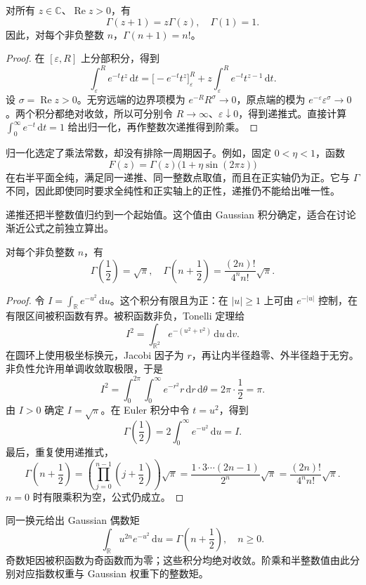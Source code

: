 \begin{proposition}[递推与归一化]\label{b3:prop:21-recurrence}
对所有 \(z\in\mathbb C\)、\(\operatorname{Re}z>0\)，有
\[
 \Gamma(z+1)=z\Gamma(z),\quad \Gamma(1)=1.
\]
因此，对每个非负整数 \(n\)，\(\Gamma(n+1)=n!\)。
\end{proposition}
\begin{proof}
在 \([\varepsilon,R]\) 上分部积分，得到
\[
 \int_\varepsilon^R e^{-t}t^z\,\mathrm{d}t
 =\bigl[-e^{-t}t^z\bigr]_\varepsilon^R
  +z\int_\varepsilon^R e^{-t}t^{z-1}\,\mathrm{d}t.
\]
设 \(\sigma=\operatorname{Re}z>0\)。无穷远端的边界项模为 \(e^{-R}R^\sigma\to0\)，原点端的模为 \(e^{-\varepsilon}\varepsilon^\sigma\to0\)。两个积分都绝对收敛，所以可分别令 \(R\to\infty\)、\(\varepsilon\downarrow0\)，得到递推式。直接计算 \(\int_0^\infty e^{-t}\,\mathrm{d}t=1\) 给出归一化，再作整数次递推得到阶乘。
\end{proof}
归一化选定了乘法常数，却没有排除一周期因子。例如，固定 \(0<\eta<1\)，函数
\[
 F(z)=\Gamma(z)\bigl(1+\eta\sin(2\pi z)\bigr)
\]
在右半平面全纯，满足同一递推、同一整数点取值，而且在正实轴仍为正。它与 \(\Gamma\) 不同，因此即使同时要求全纯性和正实轴上的正性，递推仍不能给出唯一性。

\ProseParagraphBreak

递推还把半整数值归约到一个起始值。这个值由 Gaussian 积分确定，适合在讨论渐近公式之前独立算出。

\begin{proposition}\label{b3:prop:21-half-integers}
对每个非负整数 \(n\)，有
\[
 \Gamma\left(\frac12\right)=\sqrt\pi,
 \quad
 \Gamma\left(n+\frac12\right)
 =\frac{(2n)!}{4^n n!}\sqrt\pi.
\]
\end{proposition}
\begin{proof}
令 \(I=\int_{\mathbb R}e^{-u^2}\,\mathrm{d}u\)。这个积分有限且为正：在 \(|u|\ge1\) 上可由 \(e^{-|u|}\) 控制，在有限区间被积函数有界。被积函数非负，Tonelli 定理给
\[
 I^2=\int_{\mathbb R^2}e^{-(u^2+v^2)}\,\mathrm{d}u\,\mathrm{d}v.
\]
在圆环上使用极坐标换元，Jacobi 因子为 \(r\)，再让内半径趋零、外半径趋于无穷。非负性允许用单调收敛取极限，于是
\[
 I^2=\int_0^{2\pi}\int_0^\infty e^{-r^2}r\,\mathrm{d}r\,\mathrm{d}\theta
 =2\pi\cdot\frac12=\pi.
\]
由 \(I>0\) 确定 \(I=\sqrt\pi\)。在 Euler 积分中令 \(t=u^2\)，得到
\[
 \Gamma\left(\frac12\right)
 =2\int_0^\infty e^{-u^2}\,\mathrm{d}u=I.
\]
最后，重复使用递推式，
\[
 \Gamma\left(n+\frac12\right)
 =\left(\prod_{j=0}^{n-1}\left(j+\frac12\right)\right)\sqrt\pi
 =\frac{1\cdot3\cdots(2n-1)}{2^n}\sqrt\pi
 =\frac{(2n)!}{4^n n!}\sqrt\pi.
\]
\(n=0\) 时有限乘积为空，公式仍成立。
\end{proof}
同一换元给出 Gaussian 偶数矩
\[
 \int_{\mathbb R}u^{2n}e^{-u^2}\,\mathrm{d}u
 =\Gamma\left(n+\frac12\right),\quad n\ge0.
\]
奇数矩因被积函数为奇函数而为零；这些积分均绝对收敛。阶乘和半整数值由此分别对应指数权重与 Gaussian 权重下的整数矩。

